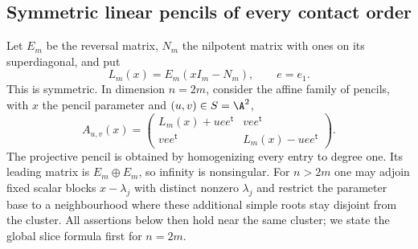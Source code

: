 \documentclass[11pt,reqno]{amsart}
\numberwithin{equation}{section}
\theoremstyle{definition}\newtheorem{definition}[theorem]{Definition}
\theoremstyle{remark}\newtheorem{remark}[theorem]{Remark}
\begin{document}
\subsection{Symmetric linear pencils of every contact order}
Let $E_m$ be the reversal matrix, $N_m$ the nilpotent matrix with ones
on its superdiagonal, and put
\[
 L_m(x)=E_m(xI_m-N_m),\qquad e=e_1.
\]
This is symmetric. In dimension $n=2m$, consider the affine family
of pencils, with $x$ the pencil parameter and $(u,v)\in S=\A^2$,
\begin{equation}\label{eq:jordan-slice-v161}
 A_{u,v}(x)=
 \begin{pmatrix}
 L_m(x)+u ee^{\mathsf t}&v ee^{\mathsf t}\\
 v ee^{\mathsf t}&L_m(x)-u ee^{\mathsf t}
 \end{pmatrix}.
\end{equation}
The projective pencil is obtained by homogenizing every entry to degree
one. Its leading matrix is $E_m\oplus E_m$, so infinity is nonsingular.
For $n>2m$ one may adjoin fixed scalar blocks $x-\lambda_j$ with
distinct nonzero $\lambda_j$ and restrict the parameter base to a
neighbourhood where these additional simple roots stay disjoint from
the cluster. All assertions below then hold near the same cluster;
we state the global slice formula first for $n=2m$.
\end{document}
